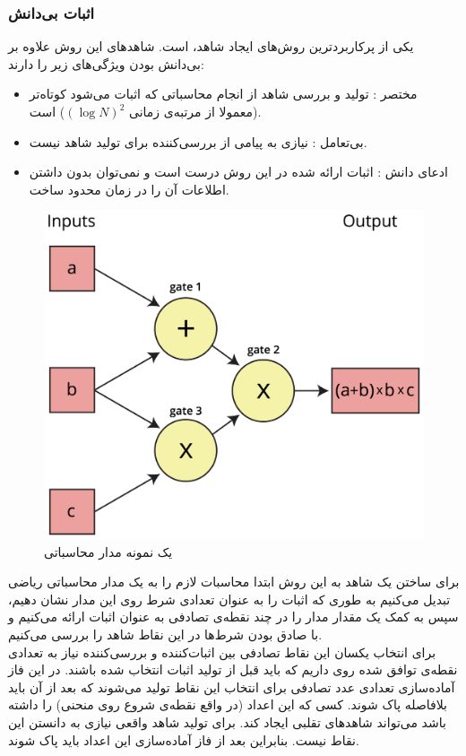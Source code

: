 \subsubsection{اثبات بی‌دانش }
یکی از پرکاربردترین روش‌های ایجاد شاهد، 
\cite{zksnark}
است. شاهد‌های این روش علاوه بر بی‌دانش بودن ویژگی‌های زیر را دارند:
\begin{itemize}
	\item 
	مختصر
	: تولید و بررسی شاهد از انجام محاسباتی که اثبات می‌شود کوتاه‌تر (معمولا از مرتبه‌ی زمانی $ (\log N) ^ 2$) است. 
	\item
	بی‌تعامل
	: نیازی به پیامی از بررسی‌کننده برای تولید شاهد نیست. 
	\item
	ادعای دانش
	: اثبات ارائه شده در این روش درست 
	است و نمی‌توان بدون داشتن اطلاعات آن را در زمان محدود ساخت.
	
\end{itemize}
 
\begin{figure}[bh]
	\centering
	\includegraphics[width=.5\linewidth]{arithmetic-circuit.png}
	\caption {یک نمونه مدار محاسباتی}
	\label{fig:arithmetic}
\end{figure}

برای ساختن یک شاهد به این روش ابتدا محاسبات لازم را به یک مدار محاسباتی ریاضی تبدیل می‌کنیم به طوری که اثبات را به عنوان تعدادی شرط روی این مدار نشان دهیم، سپس به کمک یک
مقدار مدار را در چند نقطه‌ی تصادفی به عنوان اثبات ارائه می‌کنیم و با صادق بودن شرط‌ها در این نقاط شاهد را بررسی می‌کنیم. 
\\
برای انتخاب یکسان این نقاط تصادفی بین اثبات‌کننده و بررسی‌کننده نیاز به تعدادی نقطه‌ی توافق شده روی  داریم که باید قبل از تولید اثبات انتخاب شده باشند. در این فاز آماده‌سازی تعدادی عدد تصادفی برای انتخاب این نقاط تولید می‌شوند که بعد از آن باید بلافاصله پاک شوند. کسی که این اعداد (در واقع نقطه‌ی شروع روی منحنی) را داشته باشد می‌تواند شاهد‌های تقلبی ایجاد کند. برای تولید شاهد واقعی نیازی به دانستن این نقاط نیست. بنابراین بعد از فاز آماده‌سازی این اعداد باید پاک شوند. 
